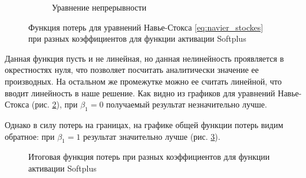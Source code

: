 \begin{figure}[H]
    \begin{subfigure}[b]{0.7\textwidth}
        \centering
        \caption{Уравнение непрерывности}
        \label{fig:pde_continuity_scale_softplus}
    \end{subfigure}
    \caption{Функция потерь для уравнений Навье-Стокса \eqref{eq:navier_stockes} при разных коэффициентов для функции активации Softplus}
    \label{fig:pde_loss_scale_softplus}
\end{figure}

Данная функция пусть и не линейная, но данная нелинейность проявляется в 
окрестностях нуля, что позволяет посчитать аналитически значение ее производных.
На остальном же промежутке можно ее считать линейной, что вводит линейность в наше решение.
Как видно из графиков для уравнений Навье-Стокса (рис. \ref{fig:pde_loss_scale_softplus}),
при $\beta_1 = 0$ получаемый результат незначительно лучше. 


Однако в силу потерь на границах, на графике общей функции потерь видим обратное:
при $\beta_1 = 1$ результат значительно лучше
(рис. \ref{fig:total_loss_scale_softplus}).

\begin{figure}[H]
    \centering
    \caption{Итоговая функция потерь при разных коэффициентов для функции активации Softplus}
    \label{fig:total_loss_scale_softplus}
\end{figure}

